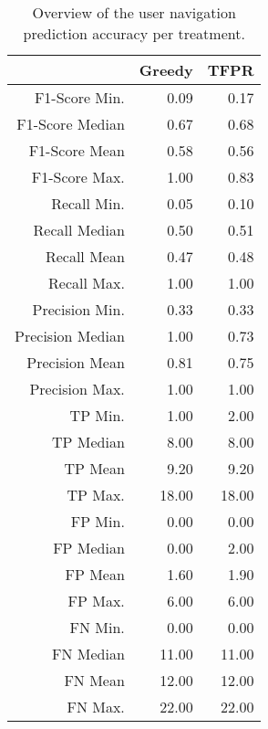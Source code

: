 \begin{table}[ht]
\centering
\begin{tabular}{rrr}
  \hline
 & Greedy & TFPR \\ 
  \hline
F1-Score Min. & 0.09 & 0.17 \\ 
  F1-Score Median & 0.67 & 0.68 \\ 
  F1-Score Mean & 0.58 & 0.56 \\ 
  F1-Score Max. & 1.00 & 0.83 \\ 
  Recall Min. & 0.05 & 0.10 \\ 
  Recall Median & 0.50 & 0.51 \\ 
  Recall Mean & 0.47 & 0.48 \\ 
  Recall Max. & 1.00 & 1.00 \\ 
  Precision Min. & 0.33 & 0.33 \\ 
  Precision Median & 1.00 & 0.73 \\ 
  Precision Mean & 0.81 & 0.75 \\ 
  Precision Max. & 1.00 & 1.00 \\ 
  TP Min. & 1.00 & 2.00 \\ 
  TP Median & 8.00 & 8.00 \\ 
  TP Mean & 9.20 & 9.20 \\ 
  TP Max. & 18.00 & 18.00 \\ 
  FP Min. & 0.00 & 0.00 \\ 
  FP Median & 0.00 & 2.00 \\ 
  FP Mean & 1.60 & 1.90 \\ 
  FP Max. & 6.00 & 6.00 \\ 
  FN Min. & 0.00 & 0.00 \\ 
  FN Median & 11.00 & 11.00 \\ 
  FN Mean & 12.00 & 12.00 \\ 
  FN Max. & 22.00 & 22.00 \\ 
   \hline
\end{tabular}
\caption{Overview of the user navigation prediction accuracy per treatment.} 
\label{tab:results:rq4:summary:treatment}
\end{table}
